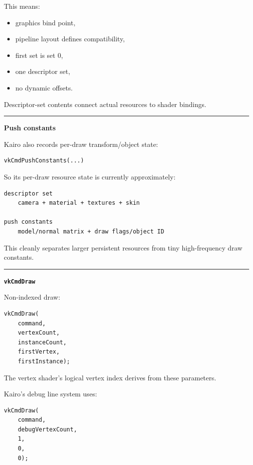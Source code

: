 This means:

\begin{itemize}
\tightlist
\item
  graphics bind point,
\item
  pipeline layout defines compatibility,
\item
  first set is set 0,
\item
  one descriptor set,
\item
  no dynamic offsets.
\end{itemize}

Descriptor-set contents connect actual resources to shader bindings.

\begin{center}\rule{0.5\linewidth}{0.5pt}\end{center}

\textbf{Push constants}

Kairo also records per-draw transform/object state:

\begin{verbatim}
vkCmdPushConstants(...)
\end{verbatim}

So its per-draw resource state is currently approximately:

\begin{verbatim}
descriptor set
    camera + material + textures + skin

push constants
    model/normal matrix + draw flags/object ID
\end{verbatim}

This cleanly separates larger persistent resources from tiny high-frequency draw constants.

\begin{center}\rule{0.5\linewidth}{0.5pt}\end{center}

\textbf{\texttt{vkCmdDraw}}

Non-indexed draw:

\begin{verbatim}
vkCmdDraw(
    command,
    vertexCount,
    instanceCount,
    firstVertex,
    firstInstance);
\end{verbatim}

The vertex shader's logical vertex index derives from these parameters.

Kairo's debug line system uses:

\begin{verbatim}
vkCmdDraw(
    command,
    debugVertexCount,
    1,
    0,
    0);
\end{verbatim}

